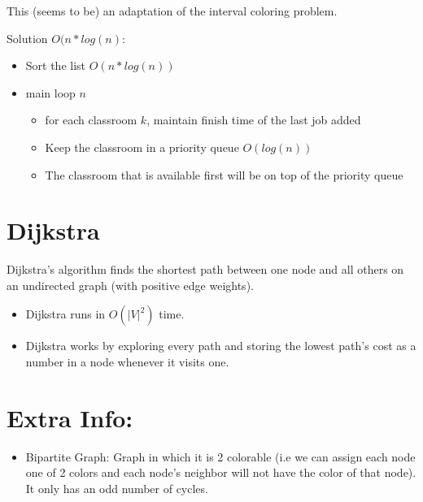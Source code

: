 \documentclass{article}
\begin{document}
This (seems to be) an adaptation of the interval coloring problem. 

Solution $O(n*log(n)$:
\begin{itemize}
    \item Sort the list $O(n*log(n))$
    \item main loop $n$ \begin{itemize}
        \item for each classroom $k$, maintain finish time of the last job added
        \item Keep the classroom in a priority queue $O(log(n))$
        \item The classroom that is available first will be on top of the priority queue
    \end{itemize}
\end{itemize}

\section{Dijkstra}
Dijkstra's algorithm finds the shortest path between one node and all others on an undirected graph (with positive edge weights). 
\begin{itemize}
    \item Dijkstra runs in $O(|V|^2)$ time.
    \item Dijkstra works by exploring every path and storing the lowest path's cost as a number in a node whenever it visits one.
\end{itemize}
\section{Extra Info:}
\begin{itemize}
    \item Bipartite Graph: Graph in which it is 2 colorable (i.e we can assign each node one of 2 colors and each node's neighbor will not have the color of that node). It only has an odd number of cycles.
\end{itemize}
\end{document}
